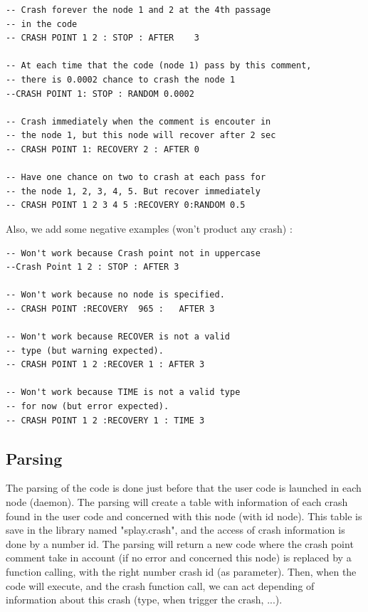 \documentclass{eplmastersthesis}
\begin{document}
          \begin{lstlisting}[style=MyLua]
-- Crash forever the node 1 and 2 at the 4th passage
-- in the code
-- CRASH POINT 1 2 : STOP : AFTER    3

-- At each time that the code (node 1) pass by this comment,
-- there is 0.0002 chance to crash the node 1
--CRASH POINT 1: STOP : RANDOM 0.0002

-- Crash immediately when the comment is encouter in
-- the node 1, but this node will recover after 2 sec
-- CRASH POINT 1: RECOVERY 2 : AFTER 0

-- Have one chance on two to crash at each pass for
-- the node 1, 2, 3, 4, 5. But recover immediately
-- CRASH POINT 1 2 3 4 5 :RECOVERY 0:RANDOM 0.5
            \end{lstlisting}

          Also, we add some negative examples (won't product any crash) :

          \begin{lstlisting}[style=MyLua]
-- Won't work because Crash point not in uppercase
--Crash Point 1 2 : STOP : AFTER 3

-- Won't work because no node is specified.
-- CRASH POINT :RECOVERY  965 :   AFTER 3

-- Won't work because RECOVER is not a valid
-- type (but warning expected).
-- CRASH POINT 1 2 :RECOVER 1 : AFTER 3

-- Won't work because TIME is not a valid type
-- for now (but error expected).
-- CRASH POINT 1 2 :RECOVERY 1 : TIME 3
          \end{lstlisting}

        \subsection{Parsing}

          The parsing of the code is done just before that the user code is launched in each node (daemon). The parsing will
          create a table with information of each crash found in the user code and concerned with this node (with id node).
          This table is save in the library named "splay.crash", and the access of crash information is done by a number id.
          The parsing will return a new code where the crash point comment take in account (if no error and concerned this node)
          is replaced by a function calling, with the right number crash id (as parameter). Then, when the code will execute,
          and the crash function call, we can act depending of information about this crash (type, when trigger the crash, ...).\\
\end{document}
